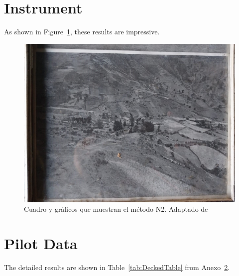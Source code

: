 \appendix

\section{Instrument}
\label{app:instrument}

As shown in Figure~\ref{fig:Figure2}, these results are impressive. \lipsum[20]

\begin{figure}[ht]
  \includegraphics[scale=0.36]{F_Figures/15_Chapter VI/Cap6_Imagen2.jpeg}
	\caption{Cuadro y gráficos que muestran el método N2. Adaptado de \cite{deWaal2009}}
	\label{fig:Figure2}
\end{figure}

\lipsum[21]

\section{Pilot Data}
\label{app:surveydata}

The detailed results are shown in Table~\ref{tab:DeckedTable} from Anexo~\ref{app:surveydata}.

\lipsum[23]


